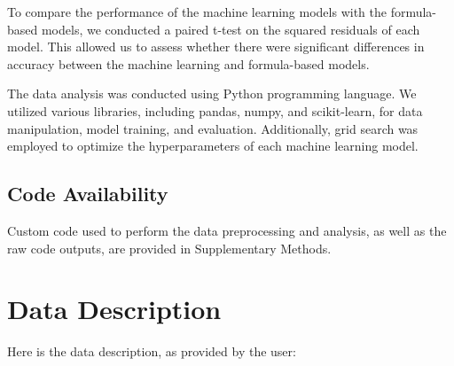 \documentclass[11pt]{article}
\begin{document}
To compare the performance of the machine learning models with the formula-based models, we conducted a paired t-test on the squared residuals of each model. This allowed us to assess whether there were significant differences in accuracy between the machine learning and formula-based models.

The data analysis was conducted using Python programming language. We utilized various libraries, including pandas, numpy, and scikit-learn, for data manipulation, model training, and evaluation. Additionally, grid search was employed to optimize the hyperparameters of each machine learning model.\subsection*{Code Availability}

Custom code used to perform the data preprocessing and analysis, as well as the raw code outputs, are provided in Supplementary Methods.


\clearpage
\appendix

\section{Data Description} \label{sec:data_description} Here is the data description, as provided by the user:
\end{document}
